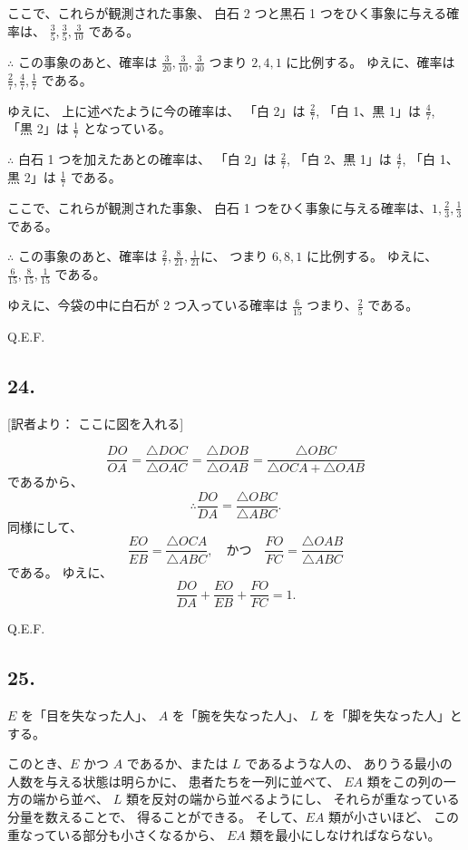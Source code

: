 ここで、これらが観測された事象、
白石 2 つと黒石 1 つをひく事象に与える確率は、
$\frac{3}{5}, \frac{3}{5}, \frac{3}{10}$
である。

$\therefore$ この事象のあと、確率は
$\frac{3}{20}, \frac{3}{10}, \frac{3}{40}$
つまり $2, 4, 1$ に比例する。
ゆえに、確率は $\frac{2}{7}, \frac{4}{7}, \frac{1}{7}$ である。

ゆえに、
上に述べたように今の確率は、
「白 2」は $\frac{2}{7}$,
「白 1、黒 1」は $\frac{4}{7}$,
「黒 2」は $\frac{1}{7}$
となっている。

$\therefore$
白石 1 つを加えたあとの確率は、
「白 2」は $\frac{2}{7}$,
「白 2、黒 1」は $\frac{4}{7}$,
「白 1、黒 2」は $\frac{1}{7}$
である。

ここで、これらが観測された事象、
白石 1 つをひく事象に与える確率は、$1, \frac{2}{3}, \frac{1}{3}$
である。

$\therefore$
この事象のあと、確率は $\frac{2}{7}, \frac{8}{21}, \frac{1}{21}$に、
つまり $6, 8, 1$ に比例する。
ゆえに、$\frac{6}{15}, \frac{8}{15}, \frac{1}{15}$ である。

ゆえに、今袋の中に白石が 2  つ入っている確率は $\frac{6}{15}$
つまり、$\frac{2}{5}$ である。

Q.E.F.

\subsection*{24.}

[訳者より： ここに図を入れる]

\[
\frac{DO}{OA} = \frac{\triangle DOC}{\triangle OAC}
 = \frac{\triangle DOB}{\triangle OAB}
 = \frac{\triangle OBC}{\triangle OCA + \triangle OAB}
 \]
 であるから、
\[
\therefore
\frac{DO}{DA} = \frac{\triangle OBC}{\triangle ABC}.
\]
同様にして、
\[
\frac{EO}{EB} =  \frac{\triangle OCA}{\triangle ABC},
\quad \mbox{かつ} \quad
\frac{FO}{FC} =  \frac{\triangle OAB}{\triangle ABC}
\]
である。
ゆえに、
\[
\frac{DO}{DA} + \frac{EO}{EB} + \frac{FO}{FC} = 1.
\]

Q.E.F.

\subsection*{25.}

$E$ を「目を失なった人」、
$A$ を「腕を失なった人」、
$L$ を「脚を失なった人」とする。

このとき、$E$ かつ $A$ であるか、または $L$ であるような人の、
ありうる最小の人数を与える状態は明らかに、
患者たちを一列に並べて、
$EA$ 類をこの列の一方の端から並べ、
$L$ 類を反対の端から並べるようにし、
それらが重なっている分量を数えることで、
得ることができる。
そして、$EA$ 類が小さいほど、
この重なっている部分も小さくなるから、
$EA$ 類を最小にしなければならない。

